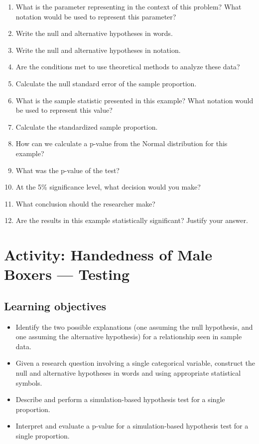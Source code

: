 \documentclass[
]{report}
\newcommand{\rgs}{\vspace{12pt}} %
\begin{document}
\begin{enumerate}
\def\labelenumi{\arabic{enumi}.}
\item
  What is the parameter representing in the context of this problem? What notation would be used to represent this parameter?
  \rgs
\item
  Write the null and alternative hypotheses in words.
  \rgs
\item
  Write the null and alternative hypotheses in notation.
  \rgs
\item
  Are the conditions met to use theoretical methods to analyze these data?
  \rgs
\item
  Calculate the null standard error of the sample proportion.
  \rgs
\item
  What is the sample statistic presented in this example? What notation would be used to represent this value?
  \rgs
\item
  Calculate the standardized sample proportion.
  \rgs
\item
  How can we calculate a p-value from the Normal distribution for this example?
  \rgs
\item
  What was the p-value of the test?
  \rgs
\item
  At the 5\% significance level, what decision would you make?
  \rgs
\item
  What conclusion should the researcher make?
  \rgs
\item
  Are the results in this example statistically significant? Justify your answer.
  \rgs
\end{enumerate}

\newpage

\hypertarget{activity-handedness-of-male-boxers-testing}{%
\section{Activity: Handedness of Male Boxers --- Testing}\label{activity-handedness-of-male-boxers-testing}}


\hypertarget{learning-objectives-2}{%
\subsection{Learning objectives}\label{learning-objectives-2}}

\begin{itemize}
\item
  Identify the two possible explanations (one assuming the null hypothesis, and one assuming the alternative hypothesis) for a relationship seen in sample data.
\item
  Given a research question involving a single categorical variable, construct the null and alternative hypotheses
  in words and using appropriate statistical symbols.
\item
  Describe and perform a simulation-based hypothesis test for a single proportion.
\item
  Interpret and evaluate a p-value for a simulation-based hypothesis test for a single proportion.
\end{itemize}
\end{document}
